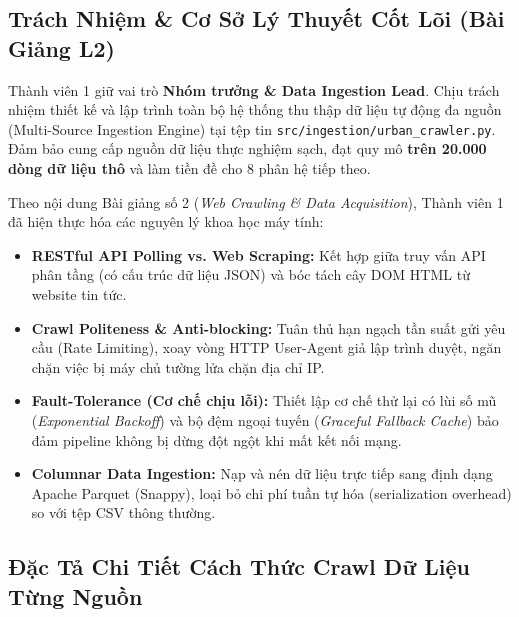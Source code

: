 \documentclass[12pt,a4paper]{article}
\begin{document}
\subsection{Trách Nhiệm \& Cơ Sở Lý Thuyết Cốt Lõi (Bài Giảng L2)}
\begin{tcolorbox}[colback=teal!5!white, colframe=teal!75!black, title=\textbf{Tóm tắt nhiệm vụ của Thành viên 1}]
Thành viên 1 giữ vai trò \textbf{Nhóm trưởng \& Data Ingestion Lead}. Chịu trách nhiệm thiết kế và lập trình toàn bộ hệ thống thu thập dữ liệu tự động đa nguồn (Multi-Source Ingestion Engine) tại tệp tin \texttt{src/ingestion/urban\_crawler.py}.\\
Đảm bảo cung cấp nguồn dữ liệu thực nghiệm sạch, đạt quy mô \textbf{trên 20.000 dòng dữ liệu thô} và làm tiền đề cho 8 phân hệ tiếp theo.
\end{tcolorbox}

Theo nội dung Bài giảng số 2 (\textit{Web Crawling \& Data Acquisition}), Thành viên 1 đã hiện thực hóa các nguyên lý khoa học máy tính:
\begin{itemize}
    \item \textbf{RESTful API Polling vs. Web Scraping:} Kết hợp giữa truy vấn API phân tầng (có cấu trúc dữ liệu JSON) và bóc tách cây DOM HTML từ website tin tức.
    \item \textbf{Crawl Politeness \& Anti-blocking:} Tuân thủ hạn ngạch tần suất gửi yêu cầu (Rate Limiting), xoay vòng HTTP User-Agent giả lập trình duyệt, ngăn chặn việc bị máy chủ tường lửa chặn địa chỉ IP.
    \item \textbf{Fault-Tolerance (Cơ chế chịu lỗi):} Thiết lập cơ chế thử lại có lùi số mũ (\textit{Exponential Backoff}) và bộ đệm ngoại tuyến (\textit{Graceful Fallback Cache}) bảo đảm pipeline không bị dừng đột ngột khi mất kết nối mạng.
    \item \textbf{Columnar Data Ingestion:} Nạp và nén dữ liệu trực tiếp sang định dạng Apache Parquet (Snappy), loại bỏ chi phí tuần tự hóa (serialization overhead) so với tệp CSV thông thường.
\end{itemize}

\subsection{Đặc Tả Chi Tiết Cách Thức Crawl Dữ Liệu Từng Nguồn}
\end{document}
